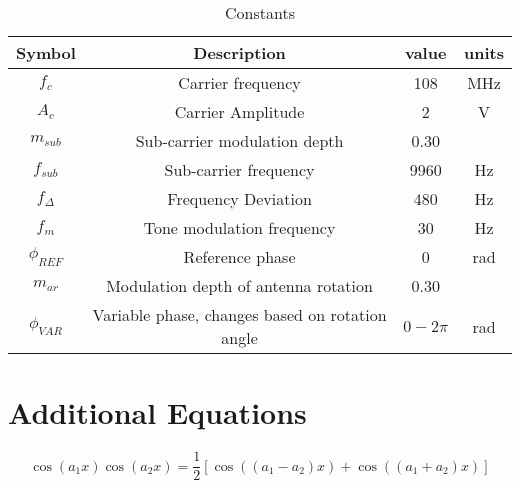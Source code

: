 \documentclass[12pt]{article}
\begin{document}
\begin{table}[ht]
\begin{tabular}{|c|c|c|c|}
\hline
\textbf{Symbol}               & \textbf{Description}                            & \textbf{value}        & \textbf{units} \\ \hline
$f_c$                          & Carrier frequency                               & 108                   & MHz            \\ \hline
$A_c$                          & Carrier Amplitude                               & 2                     & V              \\ \hline
$m_{sub}$                        & Sub-carrier modulation depth                    & 0.30                  &                \\ \hline
$f_{sub}$                        & Sub-carrier frequency                           & 9960                  & Hz             \\ \hline
$f_{\Delta}$                    & Frequency Deviation                             & 480                   & Hz             \\ \hline
$f_m$                          & Tone modulation frequency                       & 30                    & Hz             \\ \hline
$\phi_{REF}$  & Reference phase                                 & 0                     & rad            \\ \hline
$m_{ar}$                         & Modulation depth of antenna rotation            & 0.30                  &                \\ \hline
$\phi_{VAR}$ & Variable phase, changes based on rotation angle & $0-2\pi$ & rad            \\ \hline
\end{tabular}
\caption{Constants}
\label{table:data}
\end{table}
\newpage
\section{Additional Equations}

\begin{equation}
\label{cos cos additional}
\cos(a_1x)\cos(a_2x) = \frac{1}{2}[\cos((a_1-a_2)x) + \cos((a_1+a_2)x)]
\end{equation}
\end{document}
